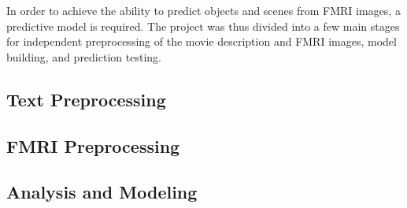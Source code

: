 \par In order to achieve the ability to predict objects and scenes 
from FMRI images, a predictive model is required. The project was thus 
divided into a few main stages for independent preprocessing of the 
movie description and FMRI images, model building, and prediction
testing.



\subsection{Text Preprocessing}


\subsection{FMRI Preprocessing}


\subsection{Analysis and Modeling}

\break 
\break